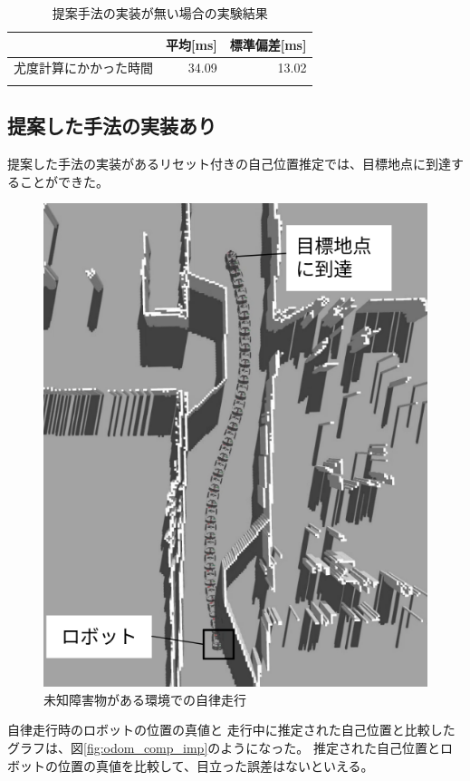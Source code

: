 \begin{table}[ht]
  \begin{center}
    \caption{提案手法の実装が無い場合の実験結果}
    \label{tabule:likelihood_calc_time_sim_no_imp}
    \begin{tabular}{l|r|r} 
      \thline
      & 平均[ms] &  標準偏差[ms] \\
      \hline
      尤度計算にかかった時間 & 34.09 & 13.02 \\
      \thline
    \end{tabular}
  \end{center}
\end{table}

\subsection{提案した手法の実装あり}

提案した手法の実装があるリセット付きの自己位置推定では、目標地点に到達することができた。

\begin{figure}[H]
  \begin{center}
    \includegraphics[width=0.5\linewidth]{figs/no_implementation_no_reset.png}
    \caption{未知障害物がある環境での自律走行}
    \label{fig:nav_imp}
  \end{center}
\end{figure}

自律走行時のロボットの位置の真値と
走行中に推定された自己位置と比較したグラフは、図\ref{fig:odom_comp_imp}のようになった。
推定された自己位置とロボットの位置の真値を比較して、目立った誤差はないといえる。

